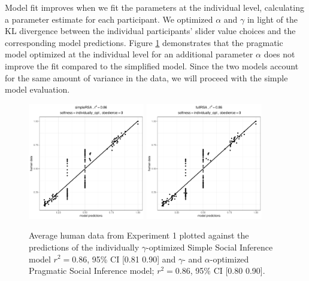 \documentclass[10pt,a4paper]{article}
\newcommand{\gcs}[1]{\textcolor{blue}{[gcs: #1]}}
\begin{document}
Model fit improves when we fit the parameters at the individual level, calculating a parameter estimate for each participant. We optimized $\alpha$ and $\gamma$ in light of the KL divergence between the individual participants' slider value choices and the corresponding model predictions.
Figure \ref{simple-full-individual} demonstrates that the pragmatic model optimized at the individual level for an additional parameter $\alpha$ does not improve the fit compared to the simplified model. 
Since the two models account for the same amount of variance in the data, we will proceed with the simple model evaluation.




\begin{figure}[ht]
	\centering
	\includegraphics[width=2in]{images/m3.pdf}
	\includegraphics[width=2in]{images/m16.pdf}
	\caption{Average human data from Experiment 1 plotted against the predictions of the individually $\gamma$-optimized Simple Social Inference model $r^{2}=0.86$, 95\% CI [0.81 0.90] and $\gamma$- and $\alpha$-optimized Pragmatic Social Inference model; $r^{2}=0.86$, 95\% CI [0.80 0.90].}\label{simple-full-individual}
\end{figure}
\end{document}
